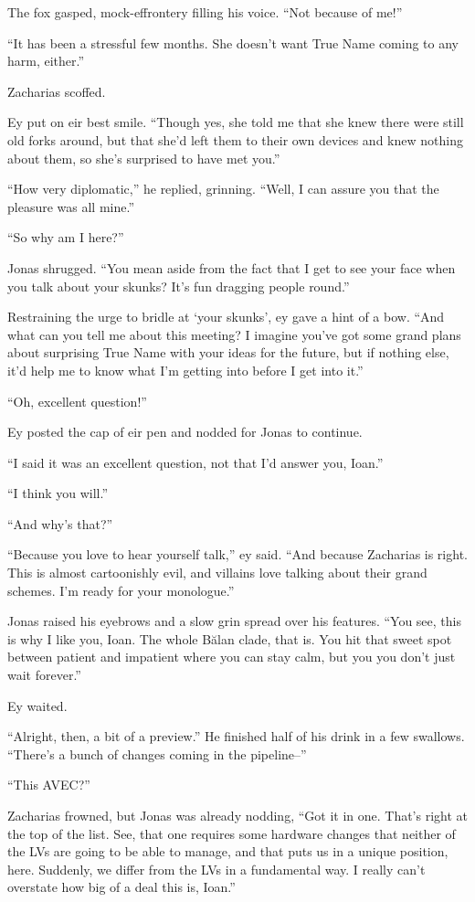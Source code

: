 The fox gasped, mock-effrontery filling his voice. ``Not because of me!''

``It has been a stressful few months. She doesn't want True Name coming to any harm, either.''

Zacharias scoffed.

Ey put on eir best smile. ``Though yes, she told me that she knew there were still old forks around, but that she'd left them to their own devices and knew nothing about them, so she's surprised to have met you.''

``How very diplomatic,'' he replied, grinning. ``Well, I can assure you that the pleasure was all mine.''

``So why am I here?''

Jonas shrugged. ``You mean aside from the fact that I get to see your face when you talk about your skunks? It's fun dragging people round.''

Restraining the urge to bridle at `your skunks', ey gave a hint of a bow. ``And what can you tell me about this meeting? I imagine you've got some grand plans about surprising True Name with your ideas for the future, but if nothing else, it'd help me to know what I'm getting into before I get into it.''

``Oh, excellent question!''

Ey posted the cap of eir pen and nodded for Jonas to continue.

``I said it was an excellent question, not that I'd answer you, Ioan.''

``I think you will.''

``And why's that?''

``Because you love to hear yourself talk,'' ey said. ``And because Zacharias is right. This is almost cartoonishly evil, and villains love talking about their grand schemes. I'm ready for your monologue.''

Jonas raised his eyebrows and a slow grin spread over his features. ``You see, this is why I like you, Ioan. The whole Bălan clade, that is. You hit that sweet spot between patient and impatient where you can stay calm, but you you don't just wait forever.''

Ey waited.

``Alright, then, a bit of a preview.'' He finished half of his drink in a few swallows. ``There's a bunch of changes coming in the pipeline--''

``This AVEC?''

Zacharias frowned, but Jonas was already nodding, ``Got it in one. That's right at the top of the list. See, that one requires some hardware changes that neither of the LVs are going to be able to manage, and that puts us in a unique position, here. Suddenly, we differ from the LVs in a fundamental way. I really can't overstate how big of a deal this is, Ioan.''


